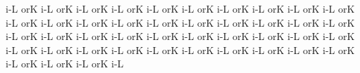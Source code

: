\sgn {}i-\punctum L\egn
\spatium
{}or\punctum K\egn
\sgn {}i-\punctum L\egn
\spatium
{}or\punctum K\egn
\sgn {}i-\punctum L\egn
\spatium
{}or\punctum K\egn
\sgn {}i-\punctum L\egn
\spatium
{}or\punctum K\egn
\sgn {}i-\punctum L\egn
\spatium
\lineaproxima
{}or\punctum K\egn
\sgn {}i-\punctum L\egn
\spatium
{}or\punctum K\egn
\sgn {}i-\punctum L\egn
\spatium
{}or\punctum K\egn
\sgn {}i-\punctum L\egn
\spatium
{}or\punctum K\egn
\sgn {}i-\punctum L\egn
\spatium
{}or\punctum K\egn
\sgn {}i-\punctum L\egn
\spatium
{}or\punctum K\egn
\sgn {}i-\punctum L\egn
\spatium
{}or\punctum K\egn
\sgn {}i-\punctum L\egn
\spatium
{}or\punctum K\egn
\sgn {}i-\punctum L\egn
\spatium
{}or\punctum K\egn
\sgn {}i-\punctum L\egn
\spatium
{}or\punctum K\egn
\sgn {}i-\punctum L\egn
\spatium
{}or\punctum K\egn
\sgn {}i-\punctum L\egn
\spatium
{}or\punctum K\egn
\sgn {}i-\punctum L\egn
\spatium
{}or\punctum K\egn
\sgn {}i-\punctum L\egn
\spatium
{}or\punctum K\egn
\sgn {}i-\punctum L\egn
\spatium
{}or\punctum K\egn
\sgn {}i-\punctum L\egn
\spatium
{}or\punctum K\egn
\sgn {}i-\punctum L\egn
\spatium
{}or\punctum K\egn
\sgn {}i-\punctum L\egn
\spatium
{}or\punctum K\egn
\sgn {}i-\punctum L\egn
\spatium
\lineaproxima
{}or\punctum K\egn
\sgn {}i-\punctum L\egn
\spatium
{}or\punctum K\egn
\sgn {}i-\punctum L\egn
\spatium
{}or\punctum K\egn
\sgn {}i-\punctum L\egn
\spatium
{}or\punctum K\egn
\sgn {}i-\punctum L\egn
\spatium
{}or\punctum K\egn
\sgn {}i-\punctum L\egn
\spatium
{}or\punctum K\egn
\sgn {}i-\punctum L\egn
\spatium
{}or\punctum K\egn
\sgn {}i-\punctum L\egn
\spatium
{}or\punctum K\egn
\sgn {}i-\punctum L\egn
\spatium
{}or\punctum K\egn
\sgn {}i-\punctum L\egn
\spatium
{}or\punctum K\egn
\sgn {}i-\punctum L\egn
\spatium
{}or\punctum K\egn
\sgn {}i-\punctum L\egn
\spatium
{}or\punctum K\egn
\sgn {}i-\punctum L\egn
\spatium
{}or\punctum K\egn
\sgn {}i-\punctum L\egn
\spatium
{}or\punctum K\egn
\sgn {}i-\punctum L\egn
\spatium
{}or\punctum K\egn
\sgn {}i-\punctum L\egn
\spatium
{}or\punctum K\egn
\sgn {}i-\punctum L\egn
\spatium
{}or\punctum K\egn
\sgn {}i-\punctum L\egn
\spatium
{}or\punctum K\egn
\sgn {}i-\punctum L\egn
\spatium
\lineaproxima
{}or\punctum K\egn
\sgn {}i-\punctum L\egn
\spatium
{}or\punctum K\egn
\sgn {}i-\punctum L\egn
\spatium
{}or\punctum K\egn
\sgn {}i-\punctum L\egn
